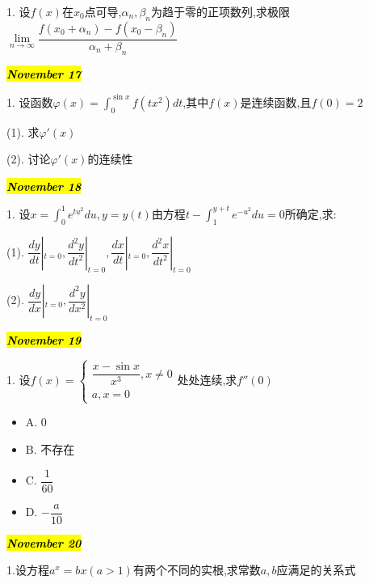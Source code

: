 1. 设$f(x)$在$x_{0}$点可导,$\alpha_{n},\beta_{n}$为趋于零的正项数列,求极限$\lim\limits_{n\rightarrow\infty}\dfrac{f(x_{0}+\alpha_{n})-f(x_{0}-\beta_{n})}{\alpha_{n}+\beta_{n}}$
\begin{solution}
	
\end{solution}

\hl{\textbf{\textit{November 17}}}

1. 设函数$\varphi(x)=\int_{0}^{\sin x}f(tx^{2})dt$,其中$f(x)$是连续函数,且$f(0)=2$

(1). 求$\varphi'(x)$

(2). 讨论$\varphi'(x)$的连续性
\begin{solution}
	
\end{solution}

\hl{\textbf{\textit{November 18}}}

1. 设$x=\int_{0}^{1}e^{tu^{2}}du,y=y(t)$由方程$t-\int_{1}^{y+t}e^{-u^{2}}du=0$所确定,求:

(1). $\dfrac{dy}{dt}|_{t=0},\dfrac{d^{2}y}{dt^{2}}|_{t=0},\dfrac{dx}{dt}|_{t=0},\dfrac{d^{2}x}{dt^{2}}|_{t=0}$

(2). $\dfrac{dy}{dx}|_{t=0},\dfrac{d^{2}y}{dx^{2}}|_{t=0}$
\begin{solution}
	
\end{solution}

\hl{\textbf{\textit{November 19}}}

1. 设$f(x)=\left\lbrace 
\begin{array}{l}
	\dfrac{x-\sin x}{x^{3}},x\neq 0\\
	a,x=0
\end{array}
\right. $处处连续,求$f''(0)$
\begin{itemize}
	\item A. $0$
	\item B. 不存在
	\item C. $\dfrac{1}{60}$
	\item D. $-\dfrac{a}{10}$
\end{itemize}
\begin{solution}
	
\end{solution}

\hl{\textbf{\textit{November 20}}}

1.设方程$a^{x}=bx(a>1)$有两个不同的实根,求常数$a,b$应满足的关系式
\begin{solution}
	
\end{solution}

